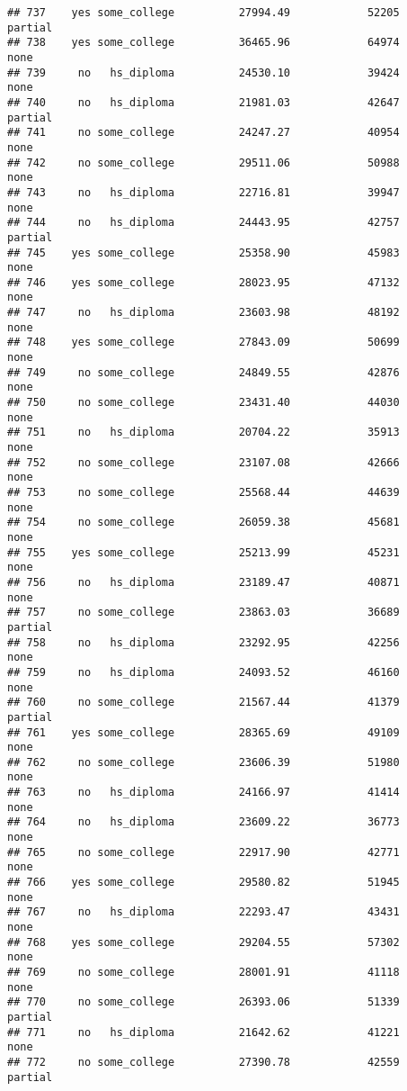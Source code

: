 \documentclass[
]{article}
\begin{document}
\begin{verbatim}
## 737    yes some_college          27994.49            52205     partial
## 738    yes some_college          36465.96            64974        none
## 739     no   hs_diploma          24530.10            39424        none
## 740     no   hs_diploma          21981.03            42647     partial
## 741     no some_college          24247.27            40954        none
## 742     no some_college          29511.06            50988        none
## 743     no   hs_diploma          22716.81            39947        none
## 744     no   hs_diploma          24443.95            42757     partial
## 745    yes some_college          25358.90            45983        none
## 746    yes some_college          28023.95            47132        none
## 747     no   hs_diploma          23603.98            48192        none
## 748    yes some_college          27843.09            50699        none
## 749     no some_college          24849.55            42876        none
## 750     no some_college          23431.40            44030        none
## 751     no   hs_diploma          20704.22            35913        none
## 752     no some_college          23107.08            42666        none
## 753     no some_college          25568.44            44639        none
## 754     no some_college          26059.38            45681        none
## 755    yes some_college          25213.99            45231        none
## 756     no   hs_diploma          23189.47            40871        none
## 757     no some_college          23863.03            36689     partial
## 758     no   hs_diploma          23292.95            42256        none
## 759     no   hs_diploma          24093.52            46160        none
## 760     no some_college          21567.44            41379     partial
## 761    yes some_college          28365.69            49109        none
## 762     no some_college          23606.39            51980        none
## 763     no   hs_diploma          24166.97            41414        none
## 764     no   hs_diploma          23609.22            36773        none
## 765     no some_college          22917.90            42771        none
## 766    yes some_college          29580.82            51945        none
## 767     no   hs_diploma          22293.47            43431        none
## 768    yes some_college          29204.55            57302        none
## 769     no some_college          28001.91            41118        none
## 770     no some_college          26393.06            51339     partial
## 771     no   hs_diploma          21642.62            41221        none
## 772     no some_college          27390.78            42559     partial

\end{verbatim}
\end{document}
